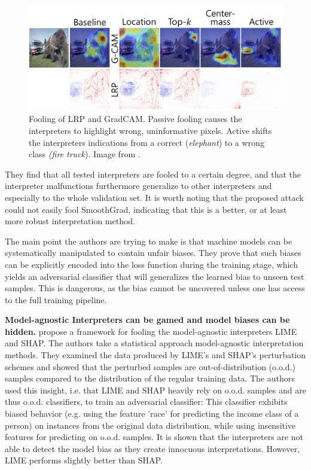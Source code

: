 \documentclass[sigconf]{acmart}
\newcommand{\mypar}[1]{\vspace{0.2cm}\noindent\textbf{#1}}
\begin{document}
\begin{figure}[ht]
    \centering
    \includegraphics[width=\linewidth]{figures/heo_intro.jpg}
    \caption{Fooling of LRP and GradCAM. Passive fooling causes the interpreters to highlight wrong, uninformative pixels. Active shifts the interpreters indications from a correct (\textit{elephant}) to a wrong class \textit{(fire truck}). Image from \cite{fooling_nn_interpreters}.}
    \label{fig:heo_intro}
    \vspace{-0.3cm}
\end{figure}

 They find that all tested interpreters are fooled to a certain degree, and that the interpreter malfunctions furthermore generalize to other interpreters and especially to the whole validation set. It is worth noting that the proposed attack could not easily fool SmoothGrad, indicating that this is a better, or at least more robust interpretation method. 

The main point the authors are trying to make is that machine models can be systematically manipulated to contain unfair biases. They prove that such biases can be explicitly encoded into the loss function during the training stage, which yields an adversarial classifier that will generalizes the learned bias to unseen test samples. This is dangerous, as the bias cannot be uncovered unless one has access to the full training pipeline. 

\mypar{Model-agnostic Interpreters can be gamed and model biases can be hidden.} 
\cite{advlime_aies20} propose a framework for fooling the model-agnostic interpreters LIME and SHAP. 
The authors take a statistical approach model-agnostic interpretation methods. They examined the data produced by LIME's and SHAP's perturbation schemes and showed that the perturbed samples are out-of-distribution (o.o.d.) samples compared to the distribution of the regular training data. The authors used this insight, i.e. that LIME and SHAP heavily rely on o.o.d. samples and are thus o.o.d. classifiers, to train an adversarial classifier: This classifier exhibits biased behavior (e.g. using the feature 'race' for predicting the income class of a person) on instances from the original data distribution, while using insensitive features for predicting on o.o.d. samples. It is shown that the interpreters are not able to detect the model bias as they create innocuous interpretations. However, LIME performs slightly better than SHAP. 
\end{document}
